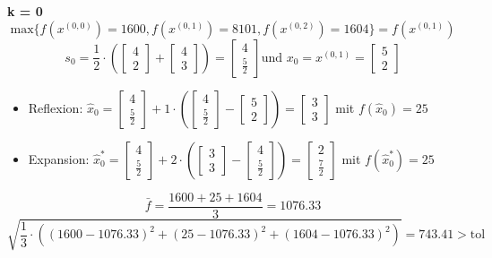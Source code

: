 \documentclass[a4paper, 12pt]{report}
\begin{document}
\textbf{k = 0}\\
$$\text{max}\{f(x^{(0,0)}) = 1600, f(x^{(0,1)}) = 8101, f(x^{(0,2)}) = 1604\} = f(x^{(0,1)})$$
$$s_0 = \frac{1}{2}\cdot \left(\begin{bmatrix}4\\2\end{bmatrix} + \begin{bmatrix}4\\3\end{bmatrix}\right) = \begin{bmatrix}4\\\frac{5}{2}\end{bmatrix} \text{und } x_0 = x^{(0,1)} = \begin{bmatrix}5\\2\end{bmatrix}$$
\begin{itemize}
\item Reflexion: $\hat x_0 = \begin{bmatrix}4\\\frac{5}{2}\end{bmatrix} + 1\cdot\left(\begin{bmatrix}4\\\frac{5}{2}\end{bmatrix} - \begin{bmatrix}5\\2\end{bmatrix}\right) = \begin{bmatrix}3\\3\end{bmatrix}$ mit $f(\hat x_0) = 25$
\item Expansion: $\hat x_0^* = \begin{bmatrix}4\\\frac{5}{2}\end{bmatrix} + 2\cdot \left(\begin{bmatrix}3\\3\end{bmatrix} - \begin{bmatrix}4\\\frac{5}{2}\end{bmatrix}\right) = \begin{bmatrix}2\\\frac{7}{2}\end{bmatrix}$ mit $f(\hat x_0^*) = 25$
\end{itemize}

$$\bar f = \frac{1600+25+1604}{3} = 1076.33$$
$$\sqrt{\frac{1}{3}\cdot \left((1600 - 1076.33)^2 + (25 - 1076.33)^2 + (1604 - 1076.33)^2\right)} = 743.41 > \text{tol}$$
\end{document}
